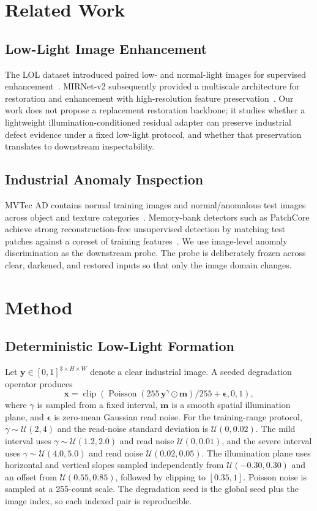 \documentclass[ASNA,twocolumn]{USG}
\begin{document}
\section{Related Work}
\subsection{Low-Light Image Enhancement}
The LOL dataset introduced paired low- and normal-light images for supervised
enhancement~\cite{wei2018retinex}. MIRNet-v2 subsequently provided a multiscale architecture for
restoration and enhancement with high-resolution feature preservation~\cite{zamir2023mirnetv2}. Our work
does not propose a replacement restoration backbone; it studies whether a lightweight
illumination-conditioned residual adapter can preserve industrial defect evidence under a fixed
low-light protocol, and whether that preservation translates to downstream inspectability.

\subsection{Industrial Anomaly Inspection}
MVTec AD contains normal training images and normal/anomalous test images across object and texture
categories~\cite{bergmann2019mvtecad}. Memory-bank detectors such as PatchCore achieve strong
reconstruction-free unsupervised detection by matching test patches against a coreset of training
features~\cite{roth2022patchcore}. We use image-level anomaly discrimination as the downstream probe. The
probe is deliberately frozen across clear, darkened, and restored inputs so that only the image domain
changes.

\section{Method}
\subsection{Deterministic Low-Light Formation}
Let $\mathbf{y}\in[0,1]^{3\times H\times W}$ denote a clear industrial image. A seeded degradation
operator produces
\begin{equation}
\mathbf{x}=\operatorname{clip}\left(\operatorname{Poisson}\left(255\,\mathbf{y}^{\gamma}\odot\mathbf{m}\right)/255+\boldsymbol{\epsilon},0,1\right),
\end{equation}
where $\gamma$ is sampled from a fixed interval, $\mathbf{m}$ is a smooth spatial illumination plane, and
$\boldsymbol{\epsilon}$ is zero-mean Gaussian read noise. For the training-range protocol,
$\gamma\sim\mathcal{U}(2,4)$ and the read-noise standard deviation is $\mathcal{U}(0,0.02)$. The mild
interval uses $\gamma\sim\mathcal{U}(1.2,2.0)$ and read noise $\mathcal{U}(0,0.01)$, and the severe
interval uses $\gamma\sim\mathcal{U}(4.0,5.0)$ and read noise $\mathcal{U}(0.02,0.05)$. The illumination
plane uses horizontal and vertical slopes sampled independently from $\mathcal{U}(-0.30,0.30)$ and an
offset from $\mathcal{U}(0.55,0.85)$, followed by clipping to $[0.35,1]$. Poisson noise is sampled at a
255-count scale. The degradation seed is the global seed plus the image index, so each indexed pair is
reproducible.
\end{document}
